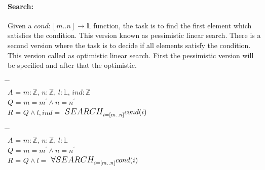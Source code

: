 \documentclass[12pt]{article}
\newcommand{\makesym}[4]{ $\mathlarger{\mathlarger{#1}}_{#2}^{#3} #4 $}
\begin{document}
    \paragraph{Search:} Given a $cond : [m..n] \to \mathbb{L}$ function, the task is to find the first element which satisfies the condition. This version known as pessimistic linear search. There is a second version where the task is to decide if all elements satisfy the condition. This version called as optimistic linear search. First the pessimistic version will be specified and after that the optimistic.
    \begin{tabbing}
    \hspace*{0.5cm} \= \hspace*{0.5cm}  \= \hspace*{1.5cm}  \= \\
    $A$ \> = \> $m:\mathbb{Z}$, $n:\mathbb{Z}$, $l:\mathbb{L}$, $ind : \mathbb{Z}$ \\ 
    $Q$ \> = \> $m=m^{'} \land n=n^{'}$ \\
    $R$ \> = \> $Q \land l, ind = $ \makesym{SEARCH}{\substack{i=[m..n]}}{}{cond(i)} 
    \end{tabbing}
    
    \begin{tabbing}
    \hspace*{0.5cm} \= \hspace*{0.5cm}  \= \hspace*{1.5cm}  \= \\
    $A$ \> = \> $m:\mathbb{Z}$, $n:\mathbb{Z}$, $l:\mathbb{L}$ \\ 
    $Q$ \> = \> $m=m^{'} \land n=n^{'}$ \\
    $R$ \> = \> $Q \land l = $ \makesym{\forall SEARCH} {\substack{i=[m..n]}}{}{cond(i)} 
    \end{tabbing}
    
\end{document}
